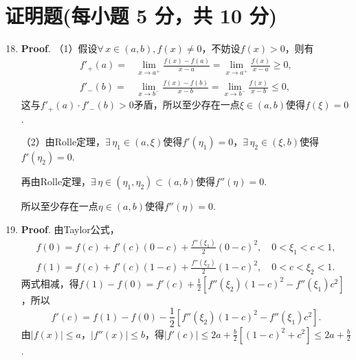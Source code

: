 \documentclass[../main.tex]{subfiles}
\begin{document}
\section{证明题(每小题 5 分，共 10 分)}
\begin{enumerate}
    \setcounter{enumi}{17}
    \item \textbf{Proof}. （1）假设$\forall\,x\in(a,b),f(x)\neq0$，不妨设$f(
              x)>0$，则有
          \[
              \begin{aligned}
                  f'_{+}(a) = {} & \lim_{x\to a^+}\frac{f(x)-f(a)}{x-a}=\lim_{x\to a^+}\frac{f(x)}{x-a}\geq0, \\
                  f'_{-}(b) = {} & \lim_{x\to b^-}\frac{f(x)-f(b)}{x-b}=\lim_{x\to b^-}\frac{f(x)}{x-b}\leq0,
              \end{aligned}
          \]
          这与$f'_{+}(a)\cdot f'_{-}(b)>0$矛盾，所以至少存在一点$\xi\in(a,b)$使得$f(\xi
              )=0$.

          （2）由Rolle定理，$\exists\,\eta_{1}\in(a,\xi)$使得$f'(\eta_{1})=0$，$\exists
              \,\eta_{2}\in(\xi,b)$使得$f'(\eta_{2})=0$.

          再由Rolle定理，$\exists\,\eta\in(\eta_{1},\eta_{2})\subset(a,b)$使得$f''(\eta
              )=0$.

          所以至少存在一点$\eta\in(a,b)$使得$f''(\eta)=0$.

    \item \textbf{Proof}. 由Taylor公式，
          \[
              \begin{gathered}
                  f(0)=f(c)+f'(c)(0-c)+\frac{f''(\xi_{1})}{2}(0-c)^2,\quad 0<\xi_1<c<1,\\
                  f(1)=f(c)+f'(c)(1-c)+\frac{f''(\xi_{2})}{2}(1-c)^2,\quad 0<c<\xi_2<1.
              \end{gathered}
          \]
          两式相减，得$f(1)-f(0)=f'(c)+\frac{1}{2}\left[f''(\xi_{2})(1-c)^{2}-f''(\xi
                  _{1})c^{2}\right]$，所以
          \[
              f'(c)=f(1)-f(0)-\frac{1}{2}\left[f''(\xi_{2})(1-c)^{2}-f''(\xi_{1})c^{2}\right
              ].
          \]
          由$|f(x)|\leq a$，$|f''(x)|\leq b$，得$|f'(c)|\leq 2a+\frac{b}{2}\left[(1-c
                  )^{2}+c^{2}\right]\leq 2a+\frac{b}{2}$.
\end{enumerate}
\end{document}
